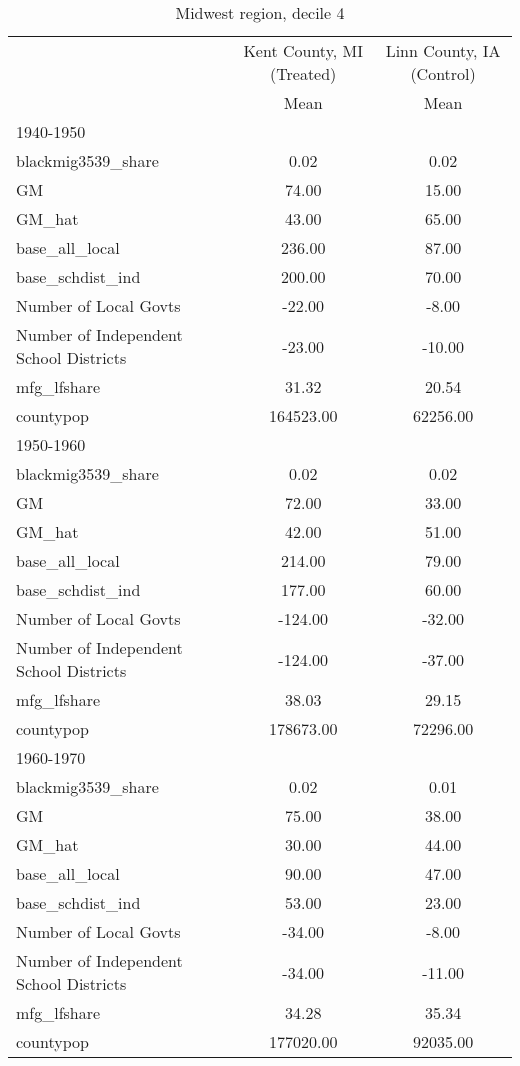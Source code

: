 \begin{table}[htbp]\centering
\def\sym#1{\ifmmode^{#1}\else\(^{#1}\)\fi}
\caption{Midwest region, decile 4 \label{tab1}}
\begin{tabular}{l*{2}{c}}
\toprule
                    &\multicolumn{1}{c}{Kent County, MI (Treated)}&\multicolumn{1}{c}{Linn County, IA (Control)}\\
                    &        Mean&        Mean\\
\midrule
1940-1950           &            &            \\
blackmig3539\_share  &        0.02&        0.02\\
GM                  &       74.00&       15.00\\
GM\_hat              &       43.00&       65.00\\
base\_all\_local      &      236.00&       87.00\\
base\_schdist\_ind    &      200.00&       70.00\\
Number of Local Govts&      -22.00&       -8.00\\
Number of Independent School Districts&      -23.00&      -10.00\\
mfg\_lfshare         &       31.32&       20.54\\
countypop           &   164523.00&    62256.00\\
\midrule
1950-1960           &            &            \\
blackmig3539\_share  &        0.02&        0.02\\
GM                  &       72.00&       33.00\\
GM\_hat              &       42.00&       51.00\\
base\_all\_local      &      214.00&       79.00\\
base\_schdist\_ind    &      177.00&       60.00\\
Number of Local Govts&     -124.00&      -32.00\\
Number of Independent School Districts&     -124.00&      -37.00\\
mfg\_lfshare         &       38.03&       29.15\\
countypop           &   178673.00&    72296.00\\
\midrule
1960-1970           &            &            \\
blackmig3539\_share  &        0.02&        0.01\\
GM                  &       75.00&       38.00\\
GM\_hat              &       30.00&       44.00\\
base\_all\_local      &       90.00&       47.00\\
base\_schdist\_ind    &       53.00&       23.00\\
Number of Local Govts&      -34.00&       -8.00\\
Number of Independent School Districts&      -34.00&      -11.00\\
mfg\_lfshare         &       34.28&       35.34\\
countypop           &   177020.00&    92035.00\\
\bottomrule
\end{tabular}
\end{table}
